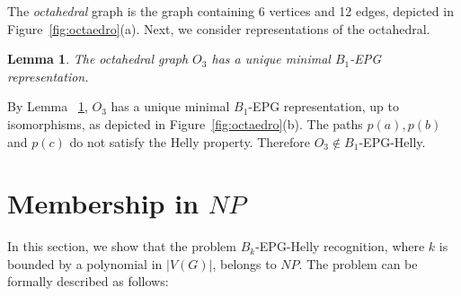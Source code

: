 \documentclass[9pt]{entcs}
\newtheorem{lema}{Lemma}[section]
\newtheorem{prove}{Proof}[section]
\begin{document}
The \textit{octahedral} graph is the graph containing 6 vertices and 12 edges, depicted  in Figure~\ref{fig:octaedro}(a). Next, we consider representations of the octahedral.

\begin{lema}\label{lem:octaedronaohelly}
The octahedral graph $O_3$ has a unique minimal  $ B_1$-EPG representation.%
\end{lema}


 

By Lemma ~\ref{lem:octaedronaohelly},  $ O_3 $ has a unique minimal $B_1$-EPG representation, up to isomorphisms, as depicted in Figure~\ref{fig:octaedro}(b). The paths $ p(a), p(b) $ and $ p(c) $  do not satisfy the Helly property. Therefore $O_3 \notin B_1$-EPG-Helly. 

\section{Membership in $NP$}

In this section, we show that the problem $B_k$-EPG-Helly recognition, where $k$ is bounded by a polynomial in $|V(G)|$, belongs to $NP$. The problem can be formally described as follows:
\end{document}
